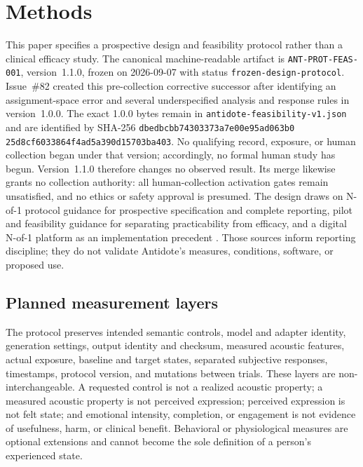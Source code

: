 \section{Methods}
\label{sec:methods}

This paper specifies a prospective design and feasibility protocol rather than
a clinical efficacy study. The canonical machine-readable artifact is
\texttt{ANT-PROT-FEAS-001}, version~1.1.0, frozen on 2026-09-07 with status
\texttt{frozen-design-protocol}. Issue~\#82 created this pre-collection
corrective successor after identifying an assignment-space error and several
underspecified analysis and response rules in version~1.0.0. The exact 1.0.0
bytes remain in \texttt{antidote-feasibility-v1.json} and are identified by
SHA-256 \texttt{dbedbcbb74303373a7e00e95ad063b0}\allowbreak
\texttt{25d8cf6033864f4ad5a390d15703ba403}.
No qualifying record, exposure, or human collection began under that version;
accordingly, no formal human study has begun. Version~1.1.0 therefore changes
no observed result. Its merge likewise grants
no collection authority: all human-collection activation gates remain
unsatisfied, and no ethics or safety approval is presumed. The design draws on
N-of-1 protocol guidance for prospective specification and complete reporting,
pilot and feasibility guidance for separating practicability from efficacy,
and a digital N-of-1 platform as an implementation precedent
\cite{porcino2020spent,eldridge2016feasibility,konigorski2022studyu}. Those
sources inform reporting discipline; they do not validate Antidote's measures,
conditions, software, or proposed use.

\subsection{Planned measurement layers}
\label{sec:planned-measurement-layers}

The protocol preserves intended semantic controls, model and adapter identity,
generation settings, output identity and checksum, measured acoustic features,
actual exposure, baseline and target states, separated subjective responses,
timestamps, protocol version, and mutations between trials. These layers are
non-interchangeable. A requested control is not a realized acoustic property; a
measured acoustic property is not perceived expression; perceived expression
is not felt state; and emotional intensity, completion, or engagement is not
evidence of usefulness, harm, or clinical benefit. Behavioral or physiological
measures are optional extensions and cannot become the sole definition of a
person's experienced state.

